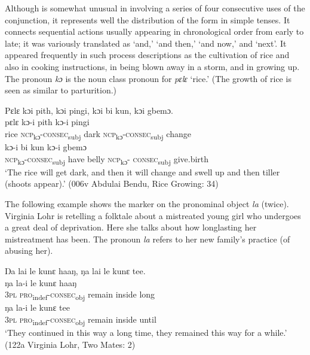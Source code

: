 Although  is somewhat unusual in involving a series of four consecutive uses of the conjunction, it represents well the distribution of the form in simple tenses. It connects sequential actions usually appearing in chronological order from early to late; it was variously translated as ‘and,' ‘and then,' ‘and now,' and ‘next'. It appeared frequently in such process descriptions as the cultivation of rice and also in cooking instructions, in being blown away in a storm, and in growing up. The pronoun \textit{kɔ} is the noun class pronoun for \textit{pɛlɛ} ‘rice.' (The growth of rice is seen as similar to parturition.)

\ea%
    \label{ex:203}
    Pɛlɛ kɔi pith, kɔi pingi, kɔi bi kun, kɔi gbemɔ.\\
    \gll pɛlɛ  kɔ-i          pith  kɔ-i          pingi\\
    rice  \textsc{ncp}\textsubscript{kɔ}\textsc{{}-consec}\textsubscript{subj}  dark  \textsc{ncp}\textsubscript{kɔ}\textsc{{}-consec}\textsubscript{subj}  change\\
    \gll kɔ-i          bi    kun    kɔ-i            gbemɔ\\
    \textsc{ncp}\textsubscript{kɔ}\textsc{{}-consec}\textsubscript{subj}  have  belly    \textsc{ncp}\textsubscript{kɔ}\textsc{{}- consec}\textsubscript{subj}    give.birth\\
    \glt ‘‎The rice will get dark, and then it will change and swell up and then tiller (shoots appear).' (006v Abdulai Bendu, Rice Growing: 34)
\z

The following example shows the marker on the pronominal object \textit{la} (twice). Virginia Lohr is retelling a folktale about a mistreated young girl who undergoes a great deal of deprivation. Here she talks about how longlasting her mistreatment has been. The pronoun \textit{la} refers to her new family's practice (of abusing her).

\newpage
\ea%
    \label{ex:204}
    Ŋa lai le kunε haaŋ, ŋa lai le kunε tee.\\
    \gll ŋa    la-i            le        kunε    haaŋ\\
    3\textsc{pl}  \textsc{pro}\textsubscript{indef}\textsc{{}-consec}\textsubscript{obj}  remain    inside    long\\
    \gll ŋa    la-i            le        kunε    tee\\
    3\textsc{pl}  \textsc{pro}\textsubscript{indef}{}-\textsc{consec}\textsubscript{obj}  remain    inside    until\\
    \glt ‘They continued in this way a long time, they remained this way for a while.' (122a Virginia Lohr, Two Mates: 2)
\z

